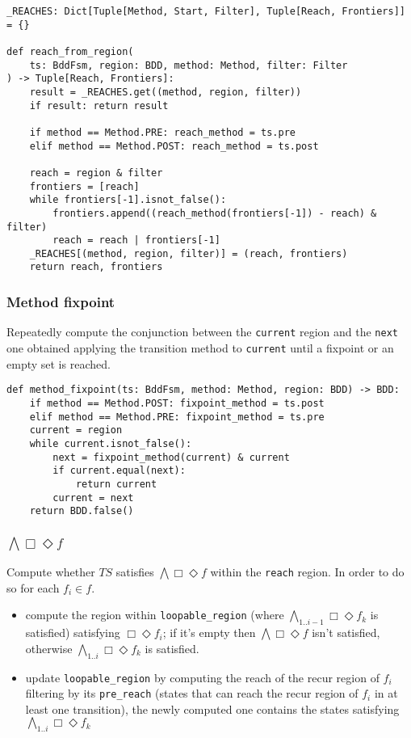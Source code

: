\documentclass[11pt]{article}
\newcommand{\minline}[1]{{\footnotesize \texttt{#1}}}
\begin{document}
\begin{verbatim}
_REACHES: Dict[Tuple[Method, Start, Filter], Tuple[Reach, Frontiers]] = {}

def reach_from_region(
    ts: BddFsm, region: BDD, method: Method, filter: Filter
) -> Tuple[Reach, Frontiers]:
    result = _REACHES.get((method, region, filter))
    if result: return result

    if method == Method.PRE: reach_method = ts.pre
    elif method == Method.POST: reach_method = ts.post

    reach = region & filter
    frontiers = [reach]
    while frontiers[-1].isnot_false():
        frontiers.append((reach_method(frontiers[-1]) - reach) & filter)
        reach = reach | frontiers[-1]
    _REACHES[(method, region, filter)] = (reach, frontiers)
    return reach, frontiers
\end{verbatim}

\subsubsection{Method fixpoint}

Repeatedly compute the conjunction between the \minline{current} region and
the \minline{next} one obtained applying the transition method to
\minline{current} until a fixpoint or an empty set is reached.

\begin{verbatim}
def method_fixpoint(ts: BddFsm, method: Method, region: BDD) -> BDD:
    if method == Method.POST: fixpoint_method = ts.post
    elif method == Method.PRE: fixpoint_method = ts.pre
    current = region
    while current.isnot_false():
        next = fixpoint_method(current) & current
        if current.equal(next):
            return current
        current = next
    return BDD.false()
\end{verbatim}

\subsubsection{$\bigwedge \Box\Diamond f$}

Compute whether $TS$ satisfies $\bigwedge \Box\Diamond f$ within the
\minline{reach} region. In order to do so for each $f_i \in f$.
\begin{itemize}
	\item compute the region within \minline{loopable_region} (where
	      $\bigwedge_{1..i-1} \Box\Diamond f_k$ is satisfied) satisfying
	      $\Box\Diamond f_i$; if it's empty then $\bigwedge \Box\Diamond f$
	      isn't satisfied, otherwise $\bigwedge_{1..i} \Box\Diamond f_k$ is
	      satisfied.
	\item update \minline{loopable_region} by computing the reach of the recur
	      region of $f_i$ filtering by its \minline{pre_reach} (states that can
	      reach the recur region of $f_i$ in at least one transition), the newly
	      computed one contains the states satisfying
	      $\bigwedge_{1..i} \Box\Diamond f_k$
\end{itemize}
\end{document}
